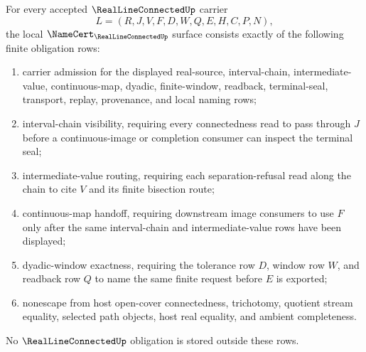 \begin{theorem}
\label{thm:real-line-connected-namecert-obligations}
For every accepted $\RealLineConnectedUp$ carrier
$$
L=(R,J,V,F,D,W,Q,E,H,C,P,N),
$$
the local $\NameCert_{\RealLineConnectedUp}$ surface consists exactly of the following finite obligation rows:
\begin{enumerate}
\item carrier admission for the displayed real-source, interval-chain, intermediate-value, continuous-map, dyadic, finite-window, readback, terminal-seal, transport, replay, provenance, and local naming rows;
\item interval-chain visibility, requiring every connectedness read to pass through $J$ before a continuous-image or completion consumer can inspect the terminal seal;
\item intermediate-value routing, requiring each separation-refusal read along the chain to cite $V$ and its finite bisection route;
\item continuous-map handoff, requiring downstream image consumers to use $F$ only after the same interval-chain and intermediate-value rows have been displayed;
\item dyadic-window exactness, requiring the tolerance row $D$, window row $W$, and readback row $Q$ to name the same finite request before $E$ is exported;
\item nonescape from host open-cover connectedness, trichotomy, quotient stream equality, selected path objects, host real equality, and ambient completeness.
\end{enumerate}
No $\RealLineConnectedUp$ obligation is stored outside these rows.
\end{theorem}
